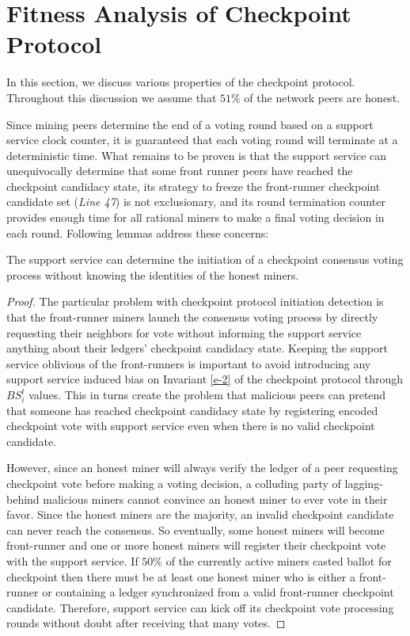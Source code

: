         
\section{Fitness Analysis of Checkpoint Protocol}
\label{s-analysis}
In this section, we discuss various properties of the checkpoint protocol. Throughout this discussion we assume that $51\%$ of the network peers are honest.

Since mining peers determine the end of a voting round based on a support service clock counter, it is guaranteed that each voting round will terminate at a deterministic time. What remains to be proven is that the support service can unequivocally determine that some front runner peers have reached the checkpoint candidacy state, its strategy to freeze the front-runner checkpoint candidate set (\textit{Line 47}) is not exclusionary, and its round termination counter provides enough time for all rational miners to make a final voting decision in each round. Following lemmas address these concerns:     

\begin{lemma}
\label{l-proto-init}
The support service can determine the initiation of a checkpoint consensus voting process without knowing the identities of the honest miners.  
\end{lemma}
\begin{proof}
The particular problem with checkpoint protocol initiation detection is that the front-runner miners launch the consensus voting process by directly requesting their neighbors for vote without informing the support service anything about their ledgers' checkpoint candidacy state. Keeping the support service oblivious of the front-runners is important to avoid introducing any support service induced bias on Invariant \ref{e-2} of the checkpoint protocol through $BS_i^t$ values. This in turns create the problem that malicious peers can pretend that someone has reached checkpoint candidacy state by registering encoded checkpoint vote with support service even when there is no valid checkpoint candidate.

However, since an honest miner will always verify the ledger of a peer requesting checkpoint vote before making a voting decision, a colluding party of lagging-behind malicious miners cannot convince an honest miner to ever vote in their favor. Since the honest miners are the majority, an invalid checkpoint candidate can never reach the consensus. So eventually, some honest miners will become front-runner and one or more honest miners will register their checkpoint vote with the support service. If $50\%$ of the currently active miners casted ballot for checkpoint then there must be at least one honest miner who is either a front-runner or containing a ledger synchronized from a valid front-runner checkpoint candidate. Therefore, support service can kick off its checkpoint vote processing rounds without doubt after receiving that many votes. 
\end{proof}

